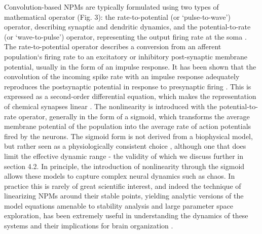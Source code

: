 \documentclass[12pt,twoside]{article}
\begin{document}

Convolution-based NPMs are typically formulated using two types of mathematical operator (Fig. 3): the rate-to-potential (or `pulse-to-wave') operator, describing synaptic and dendritic dynamics, and the potential-to-rate (or `wave-to-pulse') operator, representing the output firing rate at the soma \citep{freeman1975mass, freeman1992tutorial, cook2021neural, sanz2015mathematical}.
The rate-to-potential operator describes a conversion from an afferent population`s firing rate to an excitatory or inhibitory post-synaptic membrane potential, usually in the form of an impulse response. It has been shown that the convolution of the incoming spike rate with an impulse response adequately reproduces the postsynaptic potential in response to presynaptic firing \citep{rall1962electrophysiology, bernard1994synaptic}. This is expressed as a second-order differential equation, which makes the representation of chemical synapses linear \citep{rall1962electrophysiology, rall1964theoretical, freeman1975mass,spiegler2012dynamics}. The nonlinearity is introduced with the potential-to-rate operator, generally in the form of a sigmoid, which transforms the average membrane potential of the population into the average rate of action potentials fired by the neurons. The sigmoid form is not derived from a biophysical model, but rather seen as a physiologically consistent choice \citep{coombes2019next}, although one that does limit the effective dynamic range \citep{spiegler2012dynamics} - the validity of which we discuss further in section 4.2. In principle, the introduction of nonlinearity through the sigmoid allows these models to capture complex neural dynamics such as chaos. In practice this is rarely of great scientific interest, and indeed the technique of linearizing NPMs around their stable points, yielding analytic versions of the model equations amenable to stability analysis and large parameter space exploration, has been extremely useful in understanding the dynamics of these systems and their implications for brain organization \citep{lopes1974model, robinson2002dynamics, moran2007neural, hartoyo2019parameter}.
\end{document}
